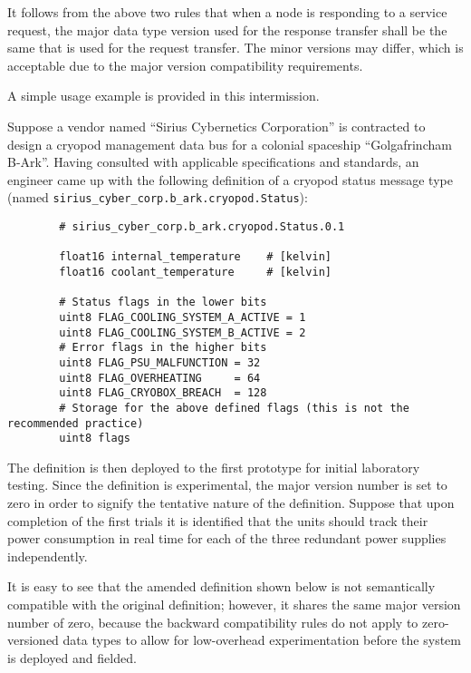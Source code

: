 It follows from the above two rules that when a node is responding to a service request,
the major data type version used for the response transfer shall be the same that is used for the request transfer.
The minor versions may differ, which is acceptable due to the major version compatibility requirements.

\begin{remark}[breakable]
    A simple usage example is provided in this intermission.

    Suppose a vendor named ``Sirius Cybernetics Corporation'' is contracted to design a
    cryopod management data bus for a colonial spaceship ``Golgafrincham B-Ark''.
    Having consulted with applicable specifications and standards, an engineer came up with the following
    definition of a cryopod status message type (named \verb|sirius_cyber_corp.b_ark.cryopod.Status|):

    \begin{verbatim}
        # sirius_cyber_corp.b_ark.cryopod.Status.0.1

        float16 internal_temperature    # [kelvin]
        float16 coolant_temperature     # [kelvin]

        # Status flags in the lower bits
        uint8 FLAG_COOLING_SYSTEM_A_ACTIVE = 1
        uint8 FLAG_COOLING_SYSTEM_B_ACTIVE = 2
        # Error flags in the higher bits
        uint8 FLAG_PSU_MALFUNCTION = 32
        uint8 FLAG_OVERHEATING     = 64
        uint8 FLAG_CRYOBOX_BREACH  = 128
        # Storage for the above defined flags (this is not the recommended practice)
        uint8 flags
    \end{verbatim}

    The definition is then deployed to the first prototype for initial laboratory testing.
    Since the definition is experimental, the major version number is set to zero in order to signify the
    tentative nature of the definition.
    Suppose that upon completion of the first trials it is identified that the units should track their
    power consumption in real time for each of the three redundant power supplies independently.

    It is easy to see that the amended definition shown below is not semantically compatible
    with the original definition; however, it shares the same major version number of zero, because the backward
    compatibility rules do not apply to zero-versioned data types to allow for low-overhead experimentation
    before the system is deployed and fielded.


\end{remark}
